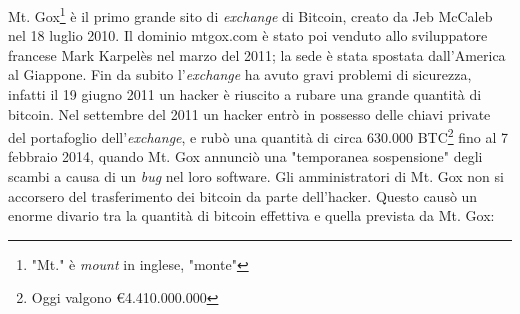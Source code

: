 \documentclass {article}
\begin{document}
Mt. Gox\footnote{"Mt." è \textit{mount} in inglese, "monte"} è il primo grande sito di \textit{exchange} di Bitcoin, creato da Jeb McCaleb nel 18 luglio 2010.
Il dominio mtgox.com è stato poi venduto allo sviluppatore francese Mark Karpelès nel marzo del 2011; la sede è stata spostata dall'America al Giappone.
Fin da subito l'\textit{exchange} ha avuto gravi problemi di sicurezza, infatti il 19 giugno 2011 un hacker è riuscito a rubare una grande quantità di bitcoin.
Nel settembre del 2011 un hacker entrò in possesso delle chiavi private del portafoglio dell'\textit{exchange}, e rubò una quantità di circa 630.000 BTC\footnote{Oggi valgono \euro{4.410.000.000}} fino al 7 febbraio 2014, quando Mt. Gox annunciò una "temporanea sospensione" degli scambi a causa di un \textit{bug} nel loro software.
Gli amministratori di Mt. Gox non si accorsero del trasferimento dei bitcoin da parte dell'hacker.
Questo causò un enorme divario tra la quantità di bitcoin effettiva e quella prevista da Mt. Gox:
\end{document}
